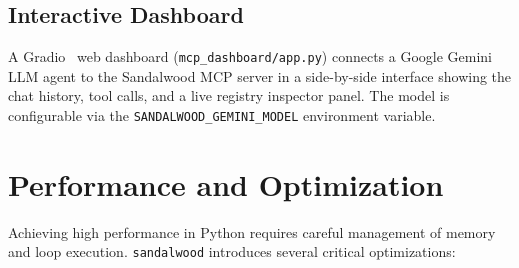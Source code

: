 \documentclass[aps,prb,reprint,superscriptaddress,nofootinbib]{revtex4-2}
\begin{document}
\subsection{Interactive Dashboard}

A Gradio~\cite{abid2019gradio} web dashboard (\texttt{mcp\_dashboard/app.py}) connects a Google Gemini LLM agent to the Sandalwood MCP server in a side-by-side interface showing the chat history, tool calls, and a live registry inspector panel. The model is configurable via the \texttt{SANDALWOOD\_GEMINI\_MODEL} environment variable.

\section{Performance and Optimization}
\label{sec:performance}

Achieving high performance in Python requires careful management of memory and loop execution. \texttt{sandalwood} introduces several critical optimizations:
\end{document}
